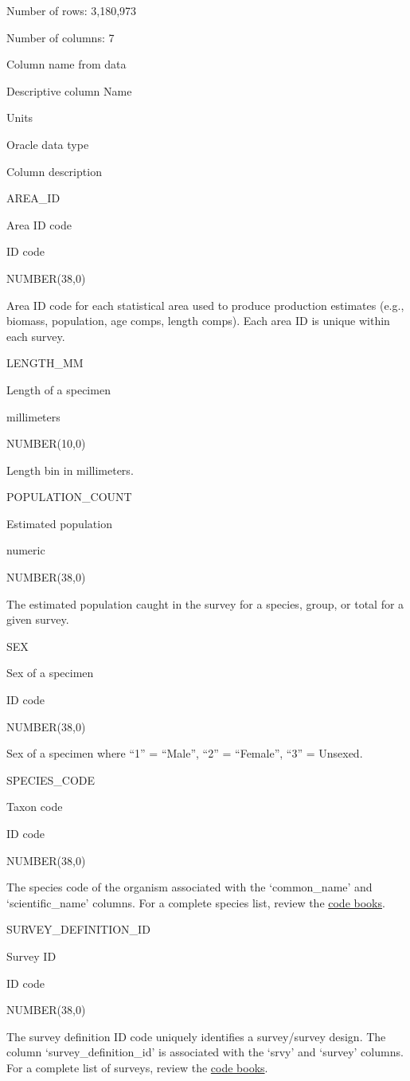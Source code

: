 \documentclass[
  letterpaper,
  oneside,
  open=any]{scrbook}
\begin{document}
Number of rows: 3,180,973

Number of columns: 7

Column name from data

Descriptive column Name

Units

Oracle data type

Column description

AREA\_ID

Area ID code

ID code

NUMBER(38,0)

Area ID code for each statistical area used to produce production
estimates (e.g., biomass, population, age comps, length comps). Each
area ID is unique within each survey.

LENGTH\_MM

Length of a specimen

millimeters

NUMBER(10,0)

Length bin in millimeters.

POPULATION\_COUNT

Estimated population

numeric

NUMBER(38,0)

The estimated population caught in the survey for a species, group, or
total for a given survey.

SEX

Sex of a specimen

ID code

NUMBER(38,0)

Sex of a specimen where ``1'' = ``Male'', ``2'' = ``Female'', ``3'' =
Unsexed.

SPECIES\_CODE

Taxon code

ID code

NUMBER(38,0)

The species code of the organism associated with the `common\_name' and
`scientific\_name' columns. For a complete species list, review the
\href{https://www.fisheries.noaa.gov/resource/document/groundfish-survey-species-code-manual-and-data-codes-manual}{code
books}.

SURVEY\_DEFINITION\_ID

Survey ID

ID code

NUMBER(38,0)

The survey definition ID code uniquely identifies a survey/survey
design. The column `survey\_definition\_id' is associated with the
`srvy' and `survey' columns. For a complete list of surveys, review the
\href{https://www.fisheries.noaa.gov/resource/document/groundfish-survey-species-code-manual-and-data-codes-manual}{code
books}.
\end{document}

